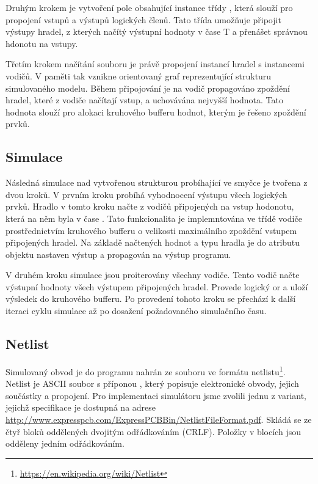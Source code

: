 \documentclass[11pt,a4paper]{article}
\begin{document}
			Druhým krokem je vytvoření pole obsahující instance třídy , která slouží pro propojení vstupů a výstupů logických členů. Tato třída umožňuje připojit výstupy hradel, z kterých načítý výstupní hodnoty v čase T a přenášet správnou hdonotu na vstupy.

			Třetím krokem načítání souboru je právě propojení instancí hradel s instancemi vodičů. V paměti tak vznikne orientovaný graf reprezentující strukturu simulovaného modelu. Během připojování je na vodič propagováno zpoždění hradel, které z vodiče načítají vstup, a uchovávána nejvyšší hodnota. Tato hodnota slouží pro alokaci kruhového bufferu hodnot, kterým je řešeno zpoždění prvků.

		\subsection{Simulace}
			Následná simulace nad vytvořenou strukturou probíhající ve smyčce je tvořena z dvou kroků. V prvním kroku probíhá vyhodnocení výstupu všech logických prvků. Hradlo v tomto kroku načte z vodičů připojených na vstup hodonotu, která na něm byla v čase . Tato funkcionalita je implemntována ve třídě vodiče prostřednictvím kruhového bufferu o velikosti maximálního zpoždění vstupem připojených hradel. Na základě načtených hodnot a typu hradla je do atributu objektu nastaven výstup a propagován na výstup programu.

			V druhém kroku simulace jsou proiterovány všechny vodiče. Tento vodič načte výstupní hodnoty všech výstupem připojených hradel. Provede logický or a uloží výsledek do kruhového bufferu. Po provedení tohoto kroku se přechází k další iteraci cyklu simulace až po dosažení požadovaného simulačního času.

		\subsection{Netlist}
			\label{netlist}

			Simulovaný obvod je do programu nahrán ze souboru ve formátu netlistu\footnote{\url{https://en.wikipedia.org/wiki/Netlist}}. Netlist je ASCII soubor s příponou , který popisuje elektronické obvody, jejich součástky a propojení. Pro implementaci simulátoru jsme zvolili jednu z variant, jejichž specifikace je dostupná na adrese \url{http://www.expresspcb.com/ExpressPCBBin/NetlistFileFormat.pdf}.
			Skládá se ze čtyř bloků oddělených dvojitým odřádkováním (CRLF). Položky v blocích jsou odděleny jedním odřádkováním.
\end{document}
